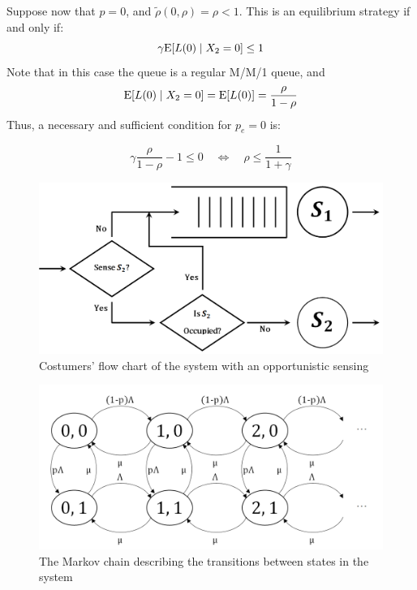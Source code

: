 \documentclass[11pt]{article}
\numberwithin{equation}{section}
\newcommand{\e}{{\rm E}}
\begin{document}
Suppose now that $p=0$, and $\tilde{\rho}(0,\rho) = \rho < 1$. This is an equilibrium strategy if and only if:
\[ \gamma \e[L(0)\mid X_2=0] \leq 1 \]
Note that in this case the queue is a regular M/M/1 queue, and 
\[ \e[L(0)\mid X_2=0] = \e[L(0)] = \frac{\rho}{1-\rho} \] 
Thus, a necessary and sufficient condition for $p_{e}=0$ is:

\[ \gamma \frac{\rho}{1-\rho}-1 \leq 0 \quad\Leftrightarrow\quad \rho \leq \frac{1}{1+\gamma} \]

\newpage
\begin{figure}[h!]
    \centering
    \includegraphics[width=1\textwidth]{Fig_1.png}
    \caption{Costumers' flow chart of the system with an opportunistic sensing}
    \label{CostumersFlow}
\end{figure}

\begin{figure}[h!]
  \centering
    \includegraphics[width=1\textwidth]{Fig_2.png}
    \caption{The Markov chain describing the transitions between states in the system}
    \label{MarkovChain}
\end{figure}
\end{document}
